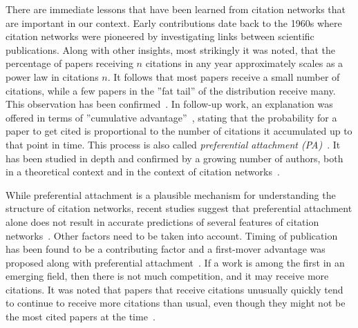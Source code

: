 \documentclass[draft,final]{vutinfth} %
\begin{document}
There are immediate lessons that have been learned from citation networks that are important in our context. Early contributions date back to the 1960s \cite{deSollaPrice1965} where citation networks were pioneered by investigating links between scientific publications. Along with other insights, most strikingly it was noted, that the percentage of papers receiving $n$ citations in any year approximately scales as a power law in citations $n$. It follows that most papers receive a small number of citations, while a few papers in the ''fat tail'' of the distribution receive many. This observation has been confirmed~\cite{seglen1992, Redner1998}. In follow-up work, an explanation was offered in terms of ''cumulative advantage''~\cite{Price1976}, stating that the probability for a paper to get cited is proportional to the number of citations it accumulated up to that point in time. This process is also called \textit{preferential attachment (PA)}~\cite{Barabsi1999x}. It has been studied in depth and confirmed by a growing number of authors, both in a theoretical context and in the context of citation networks~\cite{Krapivsky2001, Dorogovtsev2002, Albert2002, Newman2003-x, Newman2001, Capocci2006, Jeong_2003}.

While preferential attachment is a plausible mechanism for understanding the structure of citation networks, recent studies suggest that preferential attachment alone does not result in accurate predictions of several features of citation networks~\cite{Borner2004, Lehmann2005}. Other factors need to be taken into account. Timing of publication has been found to be a contributing factor and a first-mover advantage was proposed along with preferential attachment~\cite{Newman2009x}. If a work is among the first in an emerging field, then there is not much competition, and it may receive more citations. It was noted that papers that receive citations unusually quickly tend to continue to receive more citations than usual, even though they might not be the most cited papers at the time~\cite{Newman_2014x}. 
\end{document}
